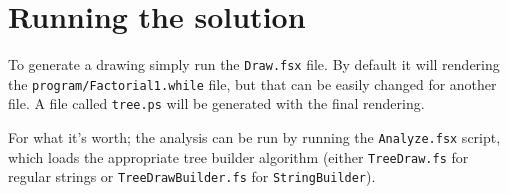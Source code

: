 \documentclass{article}
\begin{document}
\section{Running the solution}
To generate a drawing simply run the \texttt{Draw.fsx} file. By default it will rendering the \texttt{program/Factorial1.while} file, but that can be easily changed for another file. A file called \texttt{tree.ps} will be generated with the final rendering.

For what it's worth; the analysis can be run by running the \texttt{Analyze.fsx} script, which loads the appropriate tree builder algorithm (either {\tt TreeDraw.fs} for regular strings or {\tt TreeDrawBuilder.fs} for {\tt StringBuilder}).
\end{document}
